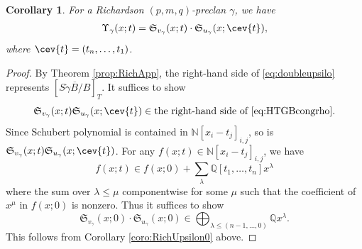 \documentclass[12pt,reqno]{amsart}
\numberwithin{equation}{section}
\newtheorem{coro}[theorem]{Corollary}
\theoremstyle{definition}
\begin{document}
\begin{coro}\label{coro:RichUpsilon}
For a Richardson $(p,m,q)$-preclan $\gamma$, we have 
\begin{align}\label{eq:doubleupsilo}
\Upsilon_\gamma(x;t) =
\mathfrak{S}_{v_\gamma}(x;t)\cdot
\mathfrak{S}_{u_\gamma}(x;\cev{t}),
\end{align}
where $\cev{t}=(t_n,\ldots,t_1)$.
\end{coro}
\begin{proof}
By Theorem \ref{prop:RichApp}, the right-hand side of \eqref{eq:doubleupsilo} represents $[\overline{S\dot{\gamma}B/B}]_T$. 
It suffices to show 
$$
\mathfrak{S}_{v_\gamma}(x;t)
\mathfrak{S}_{u_\gamma}(x;\cev{t})\in \text{the right-hand side of \eqref{eq:HTGBcongrho}}.$$
Since Schubert polynomial is contained in $\mathbb{N}[x_i-t_j]_{i,j}$, so is $\mathfrak{S}_{v_\gamma}(x;t)
\mathfrak{S}_{u_\gamma}(x;\cev{t})$. 
For any $f(x;t)\in \mathbb{N}[x_i-t_j]_{i,j}$, we have 
$$f(x;t)\in f(x;0)+
\sum_{\lambda} \mathbb{Q}[t_1,\ldots,t_n]x^\lambda$$
where the sum over $\lambda\leq \mu$ componentwise for some $\mu$ such that the coefficient of $x^\mu$ in $f(x;0)$ is nonzero. 
Thus it suffices to show 
$$\mathfrak{S}_{v_\gamma}(x;0)\cdot
\mathfrak{S}_{u_\gamma}(x;0)\in \bigoplus_{\lambda\leq (n-1,\ldots,0)}\mathbb{Q}x^\lambda.$$
This follows from Corollary \ref{coro:RichUpsilon0} above. 
\end{proof}
\end{document}

